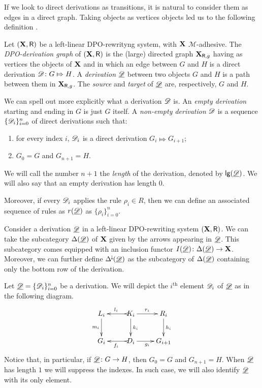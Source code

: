 If we look to direct derivations as transitions, it is natural to consider them as edges in a direct graph. Taking objects as vertices objects led us to the following definition \cite{heindel2009category}.

\begin{definition}
	Let $(\textbf {\textup{X}}, \mathsf{R})$ be a left-linear DPO-rewrityng system, with $\textbf {\textup{X}}$ $\mathcal{M}$-adhesive. The \emph{DPO-derivation graph} of $(\textbf {\textup{X}}, \mathsf{R})$ is the (large)  directed graph $\textbf {\textup{X}}_{\mathsf{R}, g}$ having as vertices the objects of $\textbf {\textup{X}}$ and in which an edge between $G$ and $H$ is a direct derivation $\mathscr{D}\colon G\Mapsto H$.	A \emph{derivation} $\underline{\mathscr{D}}$ between two objects $G$ and $H$ is a path between them in $\textbf {\textup{X}}_{\mathsf{R}, g}$. The \emph{source} and \emph{target} of $\underline{\mathscr{D}}$ are, respectively, $G$ and $H$.
\end{definition}

\begin{remark}
	We can spell out more explicitly what  a derivation $\mathscr{D}$ is.  An \emph{empty derivation} starting and ending in $G$ is just $G$ itself.  A \emph{non-empty derivation} $\mathscr{D}$ is a sequence $\{\mathscr{D}_i\}_{i=0}^n$ of direct derivations such that:
	\begin{enumerate}
		\item for every index $i$, $\mathscr{D}_i$ is a direct derivation $G_i \Mapsto G_{i+1}$;
		\item $G_0=G$ and $G_{n+1}=H$.
	\end{enumerate}
	
	We will call the number $n+1$ the \emph{length} of the derivation, denoted by $\mathsf{lg}(\underline{\mathscr{D}})$. We will also say that an empty derivation has length $0$. 
	
	Moreover,  if every $\mathscr{D}_i$ applies the rule $\rho_i\in R$, then we can define an associated sequence of rules as $r(\underline{\mathscr{D}})$ as $\{\rho_i\}_{i=0}^n$.
\end{remark}

\begin{remark}\label{rem:func}
	Consider a derivation $\underline{\mathscr{D}}$ in a left-linear DPO-rewriting system $(\textbf {\textup{X}}, \mathsf{R})$. We can take the subcategory $\Delta(\underline{\mathscr{D}})$ of $\textbf {\textup{X}}$ given by the arrows appearing in $\underline{\mathscr{D}}$. This subcategory comes equipped with an inclusion functor $I(\underline{\mathscr{D}})\colon \Delta(\underline{\mathscr{D}})\to \textbf {\textup{X}}$. Moreover, we can further define $\Delta^{\hspace{-1pt}\downarrow\hspace{-1pt}}(\underline{\mathscr{D}})$ as the subcategory of $\Delta(\underline{\mathscr{D}})$ containing only the bottom row of the derivation.
\end{remark}

\begin{notation}Let $\underline{\mathscr{D}}=\{\mathscr{D}_i\}_{i=0}^n$ be a derivation. We will depict the $i^\text{th}$ element $\mathscr{D}_i$ of $\underline{\mathscr{D}}$ as in the following diagram.  
	\[\xymatrix{L_i \ar[d]_{m_i}& K_i \ar[d]^{k_i}\ar@{>->}[l]_{l_i} \ar[r]^{r_i} & R_i \ar[d]^{h_i} \\G_{i} & \ar@{>->}[l]^{f_{i}} D_{i} \ar[r]_{g_{i}}& G_{i+1} }\]
	Notice that, in particular, if $\underline{\mathscr{D}}\colon G\to H$, then $G_0=G$ and $G_{n+1}=H$. When $\underline{\mathscr{D}}$ has length $1$ we will suppress the indexes. In such case, we will also identify $\underline{\mathscr{D}}$ with its only element. 
\end{notation} 

